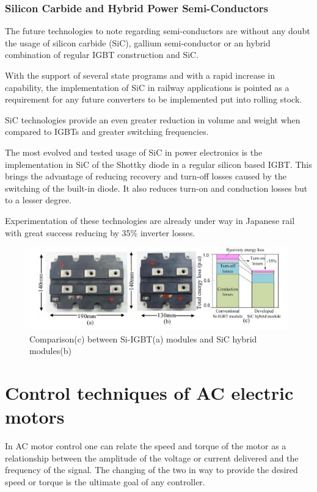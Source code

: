 \subsubsection{Silicon Carbide and Hybrid Power Semi-Conductors}
The future technologies to note regarding semi-conductors are without any doubt the usage of silicon carbide (SiC), gallium semi-conductor or an hybrid combination of regular IGBT construction and SiC.

With the support of several state programs and with a rapid increase in capability, the implementation of SiC in railway applications is pointed as a requirement for any future converters to be implemented put into rolling stock.

SiC technologies provide an even greater reduction in volume and weight when compared to IGBTs and greater switching frequencies. 

The most evolved and tested usage of SiC in power electronics is the implementation in SiC of the Shottky diode in a regular silicon based IGBT. This brings the advantage of reducing recovery and turn-off losses caused by the switching of the built-in diode. It also reduces turn-on and conduction losses but to a lesser degree. 

Experimentation of these technologies are already under way in Japanese rail with great success reducing by 35\% inverter losses\cite{MainSOTA}.

\begin{figure}[h]
    \centering
    \includegraphics{Figures/SivSiC.jpg}
    \caption{Comparison(c) between Si-IGBT(a) modules and SiC hybrid modules(b) \cite{MainSOTA}}
    \label{fig:SiVSiC}
\end{figure}

\section{Control techniques of AC electric motors}
In AC motor control one can relate the speed and torque of the motor as a relationship between the amplitude of the voltage or current delivered and the frequency of the signal. The changing of the two in way to provide the desired speed or torque is the ultimate goal of any controller.


